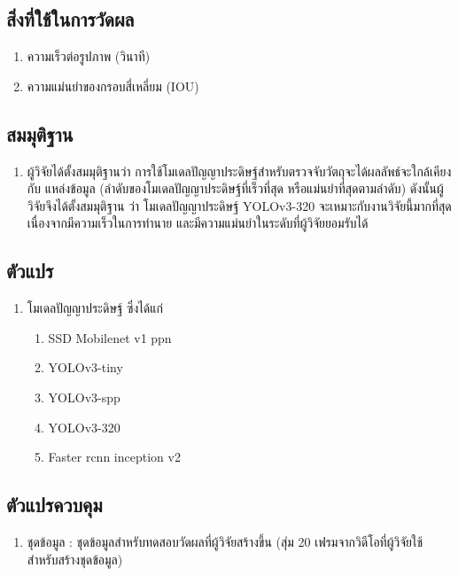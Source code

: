 \subsection*{สิ่งที่ใช้ในการวัดผล}
	\begin{enumerate}
		\item ความเร็วต่อรูปภาพ (วินาที)
		\item ความแม่นยำของกรอบสี่เหลี่ยม (IOU)
	\end{enumerate}
\subsection*{สมมุติฐาน}
	\begin{enumerate}
		\item ผู้วิจัยได้ตั้งสมมุติฐานว่า การใช้โมเดลปัญญาประดิษฐ์สำหรับตรวจจับวัตถุจะได้ผลลัพธ์จะใกล้เคียงกับ
		แหล่งข้อมูล (ลำดับของโมเดลปัญญาประดิษฐ์ที่เร็วที่สุด หรือแม่นยำที่สุดตามลำดับ) ดังนั้นผู้วิจัยจึงได้ตั้งสมมุติฐาน
		ว่า โมเดลปัญญาประดิษฐ์ YOLOv3-320 จะเหมาะกับงานวิจัยนี้มากที่สุด เนื่องจากมีความเร็วในการทำนาย
		และมีความแม่นยำในระดับที่ผู้วิจัยยอมรับได้
	\end{enumerate}
\subsection*{ตัวแปร}
	\begin{enumerate}
		\item โมเดลปัญญาประดิษฐ์ ซึ่งได้แก่
		\begin{enumerate}
			\item SSD Mobilenet v1 ppn
			\item YOLOv3-tiny
			\item YOLOv3-spp	
			\item YOLOv3-320
			\item Faster rcnn inception v2
		\end{enumerate}
	\end{enumerate}
\subsection*{ตัวแปรควบคุม}
	\begin{enumerate}
		\item ชุดข้อมูล : ชุดข้อมูลสำหรับทดสอบวัดผลที่ผู้วิจัยสร้างขึ้น (สุ่ม 20 เฟรมจากวิดีโอที่ผู้วิจัยใช้สำหรับสร้างชุดข้อมูล)
	\end{enumerate}
